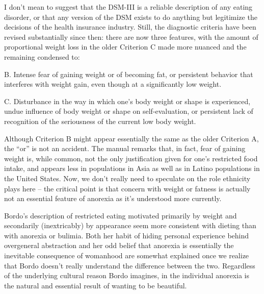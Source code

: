 \documentclass[11pt]{article}
\begin{document}
    I don't mean to suggest that the DSM-III is a reliable description of any eating disorder, or that any version of the DSM exists to do anything but legitimize the decisions of the health insurance industry. Still, the diagnostic criteria have been revised substantially since then: there are now three features, with the amount of proportional weight loss in the older Criterion C made more nuanced and the remaining condensed to:
    \begin{adjustwidth}{40pt}{0pt}
        \begin{flushleft}
        B. Intense fear of gaining weight or of becoming fat, or persistent behavior that interferes with weight gain, even though at a significantly low weight. 

        C. Disturbance in the way in which one's body weight or shape is experienced, undue influence of body weight or shape on self-evaluation, or persistent lack of recognition of the seriousness of the current low body weight.~\autocite[338--342. The revised criteria offer some other cautions to the more philosophical analyses of anorexia. For example, rather than results of confounded femininity, depressive symptoms such as mood issues and lowered interest in sex are ``also observed in individuals without anorexia nervosa who are significantly undernourished'' and ``may be secondary to the physiological sequelae of semi-starvation.'' This should be of particular interest to Bordo, who believes that low sexual activity in anorexic people stems from attempts to reject femininity.]{DSMV}
        \end{flushleft}
    \end{adjustwidth}
    Although Criterion B might appear essentially the same as the older Criterion A, the ``or'' is not an accident. The manual remarks that, in fact, fear of gaining weight is, while common, not the only justification given for one's restricted food intake, and appears less in populations in Asia as well as in Latino populations in the United States. Now, we don't really need to speculate on the role ethnicity plays here -- the critical point is that concern with weight or fatness is actually not an essential feature of anorexia as it's understood more currently.

    Bordo's description of restricted eating motivated primarily by weight and secondarily (inextricably) by appearance seem more consistent with dieting than with anorexia or bulimia. Both her habit of hiding personal experience behind overgeneral abstraction and her odd belief that anorexia is essentially the inevitable consequence of womanhood are somewhat explained once we realize that Bordo doesn't really understand the difference between the two. Regardless of the underlying cultural reason Bordo imagines, in the individual anorexia is the natural and essential result of wanting to be beautiful. 
\end{document}
